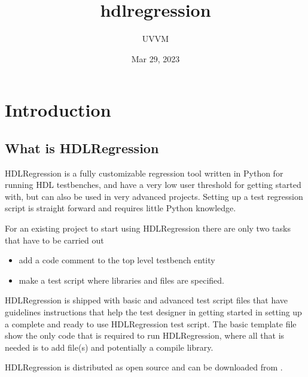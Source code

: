 \documentclass[letterpaper,10pt,english]{sphinxmanual}
\title{hdlregression}
\date{Mar 29, 2023}
\author{UVVM}
\begin{document}
\pagestyle{empty}
\sphinxmaketitle
\pagestyle{plain}
\sphinxtableofcontents
\pagestyle{normal}
\label{\detokenize{index::doc}}



\chapter{Introduction}
\label{\detokenize{intro:introduction}}\label{\detokenize{intro::doc}}

\section{What is HDLRegression}
\label{\detokenize{intro:what-is-hdlregression}}
\sphinxAtStartPar
HDLRegression is a fully customizable regression tool written in Python for running HDL testbenches, and have a
very low user threshold for getting started with, but can also be used in very advanced projects.
Setting up a test regression script is straight forward and requires little Python knowledge.

\sphinxAtStartPar
For an existing project to start using HDLRegression there are only two tasks that have to be carried out
\begin{itemize}
\item {} 
 \sphinxhyphen{} add a code comment to the top level testbench entity

\item {} 
 \sphinxhyphen{} make a test script where libraries and files are specified.

\end{itemize}

\sphinxAtStartPar
HDLRegression is shipped with basic and advanced test script {\hyperref[\detokenize{templates::doc}]{}} files that have guidelines instructions that help the
test designer in getting started in setting up a complete and ready to use HDLRegression test script.
The basic template file show the only code that is required to run HDLRegression, where all that is needed is to add file(s)
and potentially a compile library.

\sphinxAtStartPar
HDLRegression is distributed as open source and can be downloaded from .
\end{document}
